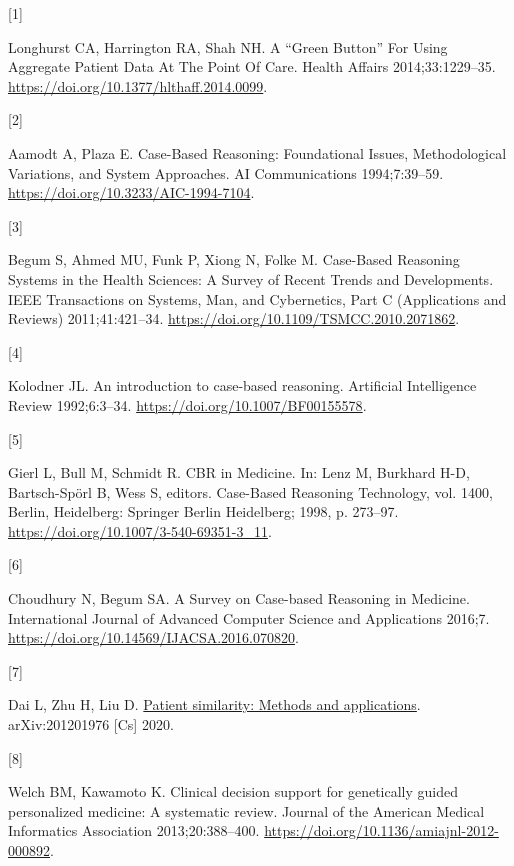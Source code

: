 \documentclass[preprint, 3p,
authoryear]{elsarticle} %
\newlength{\cslhangindent}
\newlength{\csllabelwidth}
\newlength{\cslentryspacingunit} %
\newenvironment{CSLReferences}[2] %
 {%
  \setlength{\parindent}{0pt}
  \ifodd #1
  \let\oldpar\par
  \def\par{\hangindent=\cslhangindent\oldpar}
  \fi
  \setlength{\parskip}{#2\cslentryspacingunit}
 }%
 {}
\newcommand{\CSLLeftMargin}[1]{\parbox[t]{\csllabelwidth}{#1}}
\newcommand{\CSLRightInline}[1]{\parbox[t]{\linewidth - \csllabelwidth}{#1}\break}
\begin{document}
\hypertarget{refs}{}
\begin{CSLReferences}{0}{0}
\leavevmode{}%
\CSLLeftMargin{{[}1{]} }%
\CSLRightInline{Longhurst CA, Harrington RA, Shah NH. A {``{Green
Button}''} {For Using Aggregate Patient Data At The Point Of Care}.
Health Affairs 2014;33:1229--35.
\url{https://doi.org/10.1377/hlthaff.2014.0099}.}

\leavevmode{}%
\CSLLeftMargin{{[}2{]} }%
\CSLRightInline{Aamodt A, Plaza E. Case-{Based Reasoning}: {Foundational
Issues}, {Methodological Variations}, and {System Approaches}. AI
Communications 1994;7:39--59.
\url{https://doi.org/10.3233/AIC-1994-7104}.}

\leavevmode{}%
\CSLLeftMargin{{[}3{]} }%
\CSLRightInline{Begum S, Ahmed MU, Funk P, Xiong N, Folke M. Case-{Based
Reasoning Systems} in the {Health Sciences}: {A Survey} of {Recent
Trends} and {Developments}. IEEE Transactions on Systems, Man, and
Cybernetics, Part C (Applications and Reviews) 2011;41:421--34.
\url{https://doi.org/10.1109/TSMCC.2010.2071862}.}

\leavevmode{}%
\CSLLeftMargin{{[}4{]} }%
\CSLRightInline{Kolodner JL. An introduction to case-based reasoning.
Artificial Intelligence Review 1992;6:3--34.
\url{https://doi.org/10.1007/BF00155578}.}

\leavevmode{}%
\CSLLeftMargin{{[}5{]} }%
\CSLRightInline{Gierl L, Bull M, Schmidt R. {CBR} in {Medicine}. In:
Lenz M, Burkhard H-D, Bartsch-Spörl B, Wess S, editors. Case-{Based
Reasoning Technology}, vol. 1400, {Berlin, Heidelberg}: {Springer Berlin
Heidelberg}; 1998, p. 273--97.
\url{https://doi.org/10.1007/3-540-69351-3_11}.}

\leavevmode{}%
\CSLLeftMargin{{[}6{]} }%
\CSLRightInline{Choudhury N, Begum SA. A {Survey} on {Case-based
Reasoning} in {Medicine}. International Journal of Advanced Computer
Science and Applications 2016;7.
\url{https://doi.org/10.14569/IJACSA.2016.070820}.}

\leavevmode{}%
\CSLLeftMargin{{[}7{]} }%
\CSLRightInline{Dai L, Zhu H, Liu D.
\href{https://arxiv.org/abs/2012.01976}{Patient similarity: Methods and
applications}. arXiv:201201976 {[}Cs{]} 2020.}

\leavevmode{}%
\CSLLeftMargin{{[}8{]} }%
\CSLRightInline{Welch BM, Kawamoto K. Clinical decision support for
genetically guided personalized medicine: A systematic review. Journal
of the American Medical Informatics Association 2013;20:388--400.
\url{https://doi.org/10.1136/amiajnl-2012-000892}.}


\end{CSLReferences}
\end{document}
